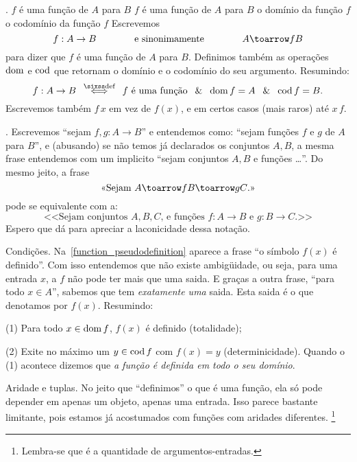 .
\label{function_notation}%
 {$f$ é uma função de $A$ para $B$}%
 {$f$ é uma função de $A$ para $B$}%
 {o domínio da função $f$}%
 {o codomínio da função $f$}%
Escrevemos
$$
f : A \to B
\qqqquad\text{e sinonimamente}\qqqquad
A \toarrow f B
$$
para dizer que $f$ é uma função de $A$ para $B$.
Definimos também as operações $\operatorname{dom}$ e $\operatorname{cod}$
que retornam o domínio e o codomínio do seu argumento.
Resumindo:
$$
f : A \to B
\quad\defiff\quad
\text{$f$ é uma função}\;\mland\;
\dom f = A\;\mland\;
\cod f = B.
$$
Escrevemos também $f\,x$ em vez de $f(x)$,
e em certos casos (mais raros) até $x\,f$.

\note.
Escrevemos ``sejam $f,g : A \to B$'' e entendemos como:
``sejam funções $f$ e $g$ de $A$ para $B$'', e (abusando) se não temos já
declarados os conjuntos $A,B$, a mesma frase entendemos com um implicito
``sejam conjuntos $A,B$ e funções \dots''.
Do mesmo jeito, a frase
$$
\text{<<{Sejam $A \toarrow f B \toarrow g C$.}>>}
$$
pode se equivalente com a:
$$
\text{<<{Sejam conjuntos $A,B,C$, e funções $f:A\to B$ e $g:B\to C$.}>>}
$$
Espero que dá para apreciar a laconicidade dessa notação.

\note Condições.
\label{functionhood_conditions}%
Na~\ref{function_pseudodefinition} aparece a frase
``o símbolo $f(x)$ é definido''.
Com isso entendemos que não existe ambigüidade, ou seja, para uma entrada $x$,
a $f$ não pode ter mais que uma saida.
E graças a outra frase, ``para todo $x\in A$'', sabemos que tem
\emph{exatamente uma} saida.  Esta saida é o que denotamos por $f(x)$.
Resumindo:
\beginil
\item{(1)} Para todo $x\in\operatorname{dom} f$, $f(x)$ é definido (totalidade);
\item{(2)} Exite no máximo um $y\in\operatorname{cod} f$ com $f(x) = y$ (determinicidade).
\endil
\noindent
Quando o (1) acontece dizemos que \emph{a função é definida em todo o seu domínio}.

\note Aridade e tuplas.
%
No jeito que ``definimos'' o que é uma função, ela só pode depender
em apenas um objeto, apenas uma entrada.
Isso parece bastante limitante, pois estamos já acostumados
com funções com aridades diferentes.%
\footnote{Lembra-se que  é a quantidade de
argumentos-entradas.}

